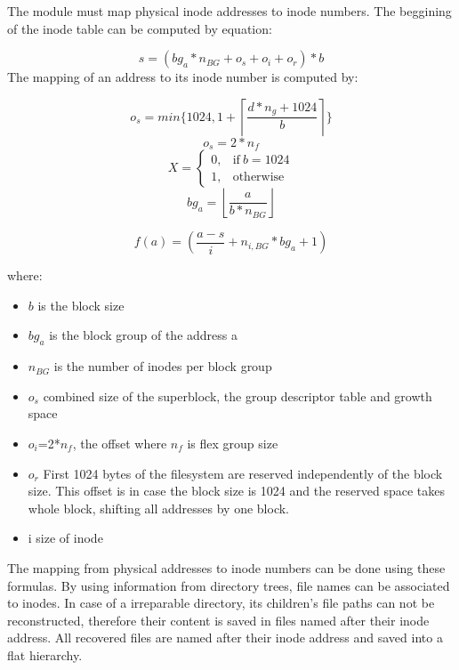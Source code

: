 \documentclass{acm_proc_article-sp}
\begin{document}
\begin{enumerate}
The module must map physical inode addresses to inode numbers. The beggining of the inode table can be computed by equation:

\[s=(bg_a * n_{BG} +o_s + o_i +o_r)*b  \]
The mapping of an address to its inode number is computed by:

\[o_s=min \{1024, 1+ \left\lceil \frac{d*n_g+1024}{b} \right\rceil \} \]
\[ o_s=2*n_f\]
\begin{equation}
  X=
  \begin{cases}
    0, & \text{if}\ b=1024 \\
    1, & \text{otherwise}
  \end{cases}
\end{equation}
\[bg_a=\left\lfloor \frac{a}{b*n_{BG}} \right\rfloor \]

\[f(a)=(\frac{a-s}{i} +n_{i,BG} *bg_a +1) \]

where:
\begin{itemize}
\item $b$ is the block size

\item $bg_a$ is the block group of the address a

\item $n_{BG}$ is the number of inodes per block group

\item $o_s$ combined size of the superblock, the group descriptor table and growth space

\item $o_i$=2*$n_f$, the offset where $n_f$ is flex group size

\item $o_r$ First 1024 bytes of the filesystem are reserved independently of the block size. This offset is in case the block size is 1024 and the reserved space takes whole block, shifting all addresses by one block.

\item i size of inode 
\end{itemize}

The mapping from physical addresses to inode numbers can be done using these formulas. By using information from directory trees, file names can be associated to inodes. In case of a irreparable directory, its children's file paths can not be reconstructed, therefore their content is saved in files named after their inode address. All recovered files are named after their inode address and saved into a flat hierarchy.




\end{enumerate}
\end{document}
